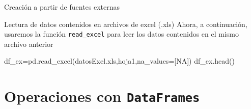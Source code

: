 \documentclass[
  ignorenonframetext,
  aspectratio=169,
  spanish,
]{beamer}
\newenvironment{Shaded}{\begin{snugshade}}{\end{snugshade}}
\newcommand{\NormalTok}[1]{\textcolor[rgb]{0.00,0.23,0.31}{#1}}
\newcommand{\OperatorTok}[1]{\textcolor[rgb]{0.37,0.37,0.37}{#1}}
\newcommand{\StringTok}[1]{\textcolor[rgb]{0.13,0.47,0.30}{#1}}
\begin{document}
\begin{frame}[fragile]{Creación a partir de fuentes externas}
\begin{block}{Lectura de datos contenidos en archivos de excel (.xls)}
\label{lectura-de-datos-contenidos-en-archivos-de-excel-.xls-2}
Ahora, a continuación, usaremos la función \texttt{read\_excel} para
leer los datos contenidos en el mismo archivo anterior

\begin{Shaded}
\begin{Highlighting}[]
\NormalTok{df\_ex}\OperatorTok{=}\NormalTok{pd.read\_excel(}\StringTok{\textquotesingle{}datosExel.xls\textquotesingle{}}\NormalTok{,}\StringTok{\textquotesingle{}hoja1\textquotesingle{}}\NormalTok{,na\_values}\OperatorTok{=}\NormalTok{[}\StringTok{\textquotesingle{}NA\textquotesingle{}}\NormalTok{])}
\NormalTok{df\_ex.head() }
\end{Highlighting}
\end{Shaded}
\end{block}
\end{frame}

\section{\texorpdfstring{Operaciones con
\texttt{DataFrames}}{Operaciones con DataFrames}}\label{operaciones-con-dataframes}
\end{document}

